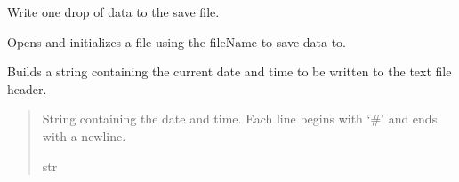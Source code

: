 \documentclass[letterpaper,10pt,english]{sphinxmanual}
\begin{document}
\begin{fulllineitems}
\begin{fulllineitems}
\end{fulllineitems}


\begin{fulllineitems}
\label{\detokenize{Morelia.Stream.Drain:Morelia.Stream.Drain.ToText.DrainToTXT.DrainDropToFile}}
\pysigstartsignatures
{}
\pysigstopsignatures
\sphinxAtStartPar
Write one drop of data to the save file.

\end{fulllineitems}


\begin{fulllineitems}
\label{\detokenize{Morelia.Stream.Drain:Morelia.Stream.Drain.ToText.DrainToTXT.OpenFile}}
\pysigstartsignatures
{}
\pysigstopsignatures
\sphinxAtStartPar
Opens and initializes a file using the fileName to save data to.

\end{fulllineitems}


\begin{fulllineitems}
\label{\detokenize{Morelia.Stream.Drain:Morelia.Stream.Drain.ToText.DrainToTXT._GetTimeHeader}}
\pysigstartsignatures
{}
\pysigstopsignatures
\sphinxAtStartPar
Builds a string containing the current date and time to be written to the text file header.
\begin{quote}\begin{description}
\sphinxAtStartPar
String containing the date and time. Each line begins with ‘\#’ and ends with a newline.

\sphinxAtStartPar
str

\end{description}\end{quote}

\end{fulllineitems}


\end{fulllineitems}
\end{document}
